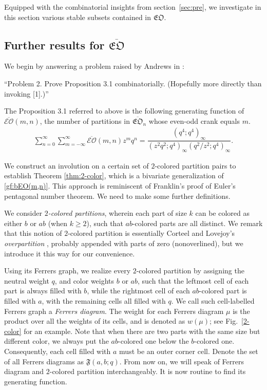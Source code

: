 \documentclass[12pt,reqno]{amsart}
\numberwithin{equation}{section}
\theoremstyle{plain}
\theoremstyle{definition}
\def\fEO{\mathfrak{EO}}
\def\bEO{\overline{\mathcal{EO}}}
\def\bfEO{\overline{\mathfrak{EO}}}
\begin{document}
Equipped with the combinatorial insights from section~\ref{sec:pre}, we investigate in this section various
stable subsets contained in $\fEO$.

\subsection{Further results for \texorpdfstring{$\bfEO$}{overlined-EO}}
We begin by answering a problem raised by Andrews in \cite{and2}:

``Problem 2. Prove Proposition 3.1 combinatorially. (Hopefully more directly than invoking [1].)''

The Proposition 3.1 referred to above is the following generating function of $\overline{\mathcal{EO}}(m,n)$,
the number of partitions in $\overline{\mathfrak{EO}}_n$ whose even-odd crank equals $m$.
\begin{align}\label{gf:bEO(m,n)}
\sum_{n=0}^{\infty}\sum_{m=-\infty}^{\infty}\bEO(m,n)z^m q^n
=\dfrac{(q^4;q^4)_\infty}{(z^2q^2;q^4)_\infty(q^2/z^2;q^4)_\infty}.
\end{align}

We construct an involution on a certain set of $2$-colored partition pairs to establish Theorem
\ref{thm:2-color}, which is a bivariate generalization of \eqref{gf:bEO(m,n)}. This approach is reminiscent
of Franklin's proof of Euler's pentagonal number theorem. We need to make some further definitions.

We consider {\em $2$-colored partitions}, wherein each part of size $k$ can be colored as either $b$ or $ab$
(when $k\ge 2$), such that $ab$-colored parts are all distinct. We remark that this notion of $2$-colored
partition is essentially Corteel and Lovejoy's \textit{overpartition} \cite{CL}, probably appended with parts
of zero (nonoverlined), but we introduce it this way for our convenience.

Using its Ferrers graph, we realize every $2$-colored partition by assigning the neutral weight $q$, and
color weights $b$ or $ab$, such that the leftmost cell of each part is always filled with $b$, while the
rightmost cell of each $ab$-colored part is filled with $a$, with the remaining cells all filled with $q$. We
call such cell-labelled Ferrers graph a \textit{Ferrers diagram}. The weight for each Ferrers diagram $\mu$
is the product over all the weights of its cells, and is denoted as $w(\mu)$; see Fig.~\ref{2-color} for an
example. Note that when there are two parts with the same size but different color, we always put the
$ab$-colored one below the $b$-colored one. Consequently, each cell filled with $a$ must be an outer corner
cell. Denote the set of all Ferrers diagrams as $\mathfrak{F}(a,b;q)$. From now on, we will speak of Ferrers
diagram and $2$-colored partition interchangeably. It is now routine to find its generating function.
\end{document}
